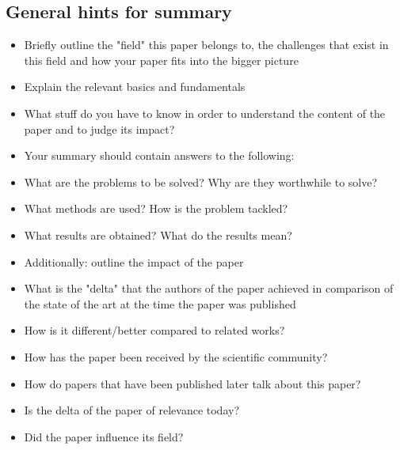 \documentclass[11pt,twocolumn,a4paper,DIV=calc]{scrartcl}
\begin{document}
\subsection{General hints for summary}

\begin{itemize}
\item Briefly outline the "field" this paper belongs to, the challenges that exist in this field and how your paper fits into the bigger picture
 \item Explain the relevant basics and fundamentals
   \item What stuff do you have to know in order to understand the content of the paper and to judge its impact?
 \item Your summary should contain answers to the following:
   \item What are the problems to be solved? Why are they worthwhile to solve?
   \item What methods are used? How is the problem tackled?
   \item What results are obtained? What do the results mean?
 \item Additionally: outline the impact of the paper
   \item What is the "delta" that the authors of the paper achieved in comparison of the state of the art at the time the paper was published
   \item How is it different/better compared to related works?
     \item How has the paper been received by the scientific community?
     \item How do papers that have been published later talk about this paper?
     \item Is the delta of the paper of relevance today?
     \item Did the paper influence its field?
\end{itemize}
\end{document}
